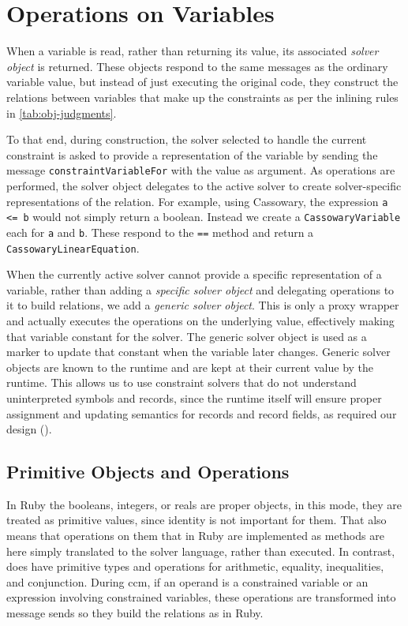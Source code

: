 \section{Operations on Variables}
\label{sec:read-assign-vari}
When a variable is read, rather than returning its value, its associated
\emph{solver object} is returned. These objects respond to the same messages as
the ordinary variable value, but instead of just executing the original code,
they construct the relations between variables that make up the constraints as
per the inlining rules in \autoref{tab:obj-judgments}. 

To that end, during construction, the solver selected to handle the current
constraint is asked to provide a representation of the variable by sending the
message \lstinline{constraintVariableFor} with the value as argument. As
operations are performed, the solver object delegates to the active solver to
create solver-specific representations of the relation. For example, using
Cassowary, the expression \lstinline{a <= b} would not simply return a boolean.
Instead we create a \lstinline{CassowaryVariable} each for \lstinline{a} and
\lstinline{b}. These respond to the \lstinline{==} method and return a
\lstinline{CassowaryLinearEquation}.

When the currently active solver cannot provide a specific representation of a
variable, rather than adding a \emph{specific solver object} and delegating
operations to it to build relations, we add a \emph{generic solver object}. This
is only a proxy wrapper and actually executes the operations on the underlying
value, effectively making that variable constant for the solver. The generic
solver object is used as a marker to update that constant when the variable
later changes. Generic solver objects are known to the runtime and are kept at
their current value by the runtime. This allows us to use constraint solvers
that do not understand uninterpreted symbols and records, since the runtime
itself will ensure proper assignment and updating semantics for records and
record fields, as required our design ().

\subsection*{Primitive Objects and Operations}
In Ruby the booleans, integers, or reals are proper objects, in this mode, they
are treated as primitive values, since identity is not important for them. That
also means that operations on them that in Ruby are implemented as methods are
here simply translated to the solver language, rather than executed. In
contrast, \javascript does have primitive types and operations for arithmetic,
equality, inequalities, and conjunction. During \gls{ccm}, if an operand is a
constrained variable or an expression involving constrained variables, these
operations are transformed into message sends so they build the relations as in
Ruby.

